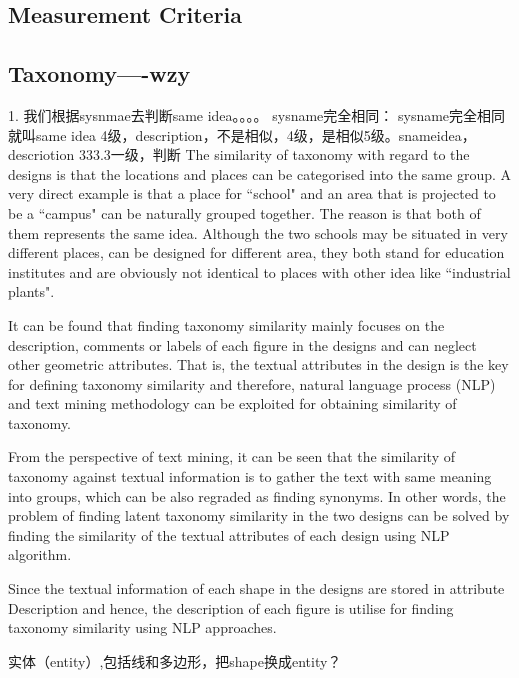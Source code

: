 \subsection*{Measurement Criteria}

\subsection*{Taxonomy----wzy}
1. 我们根据sysnmae去判断same idea。。。。 sysname完全相同： sysname完全相同就叫same idea 4级，description，不是相似，4级，是相似5级。snameidea， descriotion   333.3一级，判断
The similarity of taxonomy with regard to the designs is that the locations and places can be categorised into the same group. A very direct example is that a place for ``school" and an area that is projected to be a ``campus" can be naturally grouped together. The reason is that both of them represents the same idea. Although the two schools may be situated in very different places, can be designed for different area, they both stand for education institutes and are obviously not identical to places with other idea like ``industrial plants".
\par
It can be found that finding taxonomy similarity mainly focuses on the description, comments or labels of each figure in the designs and can neglect other geometric attributes. That is, the textual attributes in the design is the key for defining taxonomy similarity and therefore, natural language process (NLP) and text mining methodology can be exploited for obtaining similarity of taxonomy.
\par
From the perspective of text mining, it can be seen that the similarity of taxonomy against textual information is to gather the text with same meaning into groups, which can be also regraded as finding synonyms. In other words, the problem of finding latent taxonomy similarity in the two designs can be solved by finding the similarity of the textual attributes of each design using NLP algorithm.
\par
Since the textual information of each shape in the designs are stored in attribute Description and hence, the description of each figure is utilise for finding taxonomy similarity using NLP approaches. 

实体（entity）,包括线和多边形，把shape换成entity？


